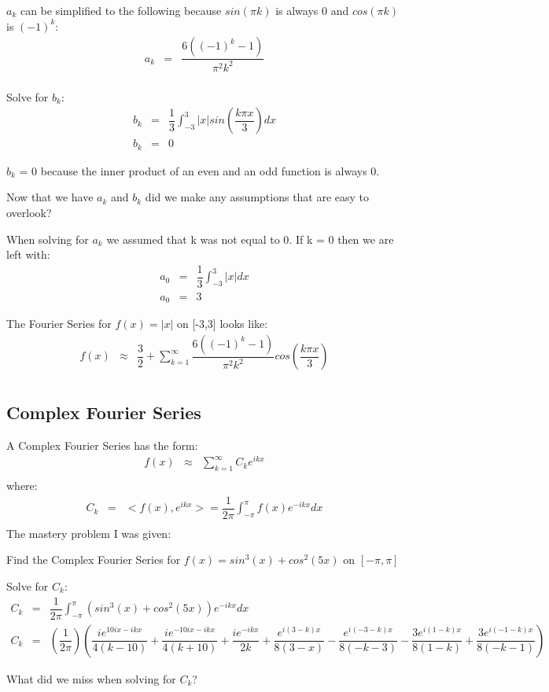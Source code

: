 \documentclass{article}
\newcommand{\bea}{\begin{eqnarray*}}
\newcommand{\eea}{\end{eqnarray*}}
\newcommand{\blue}[1]{\textcolor{blue}{#1}}
\begin{document}
$a_k$ can be simplified to the following because $sin(\pi k)$ is always 0 and $cos(\pi k)$ is $(-1)^k$:
\bea
a_k &=& \dfrac{6((-1)^k-1)}{\pi^2 k^2}\\
\eea

Solve for $b_k$:
\bea
b_k &=& \dfrac{1}{3}\int_{-3}^{3} |x|sin(\dfrac{k \pi x}{3})dx\\
b_k &=& 0
\eea

$b_k$ = 0 because the inner product of an even and an odd function is always 0.\newline 

Now that we have $a_k$ and $b_k$ did we make any assumptions that are easy to overlook?\newline

When solving for $a_k$ we assumed that k was not equal to 0. If k = 0 then we are left with:
\bea
a_0 &=& \dfrac{1}{3}\int_{-3}^{3} |x|dx\\
a_0 &=& 3
\eea

The Fourier Series for $f(x) = |x|$ on [-3,3] looks like:
\bea
f(x) &\approx& \dfrac{3}{2}+\sum_{k=1}^{\infty} \dfrac{6((-1)^k-1)}{\pi^2 k^2}cos(\dfrac{k \pi x}{3}) \\
\eea

\subsection{Complex Fourier Series}
A Complex Fourier Series has the form:
\bea
f(x) &\approx& \sum_{k=1}^{\infty} C_ke^{ikx} \\
\eea
where:
\bea
C_k &=& <f(x),e^{ikx}> = \dfrac{1}{2\pi}\int_{-\pi}^{\pi} f(x)e^{-ikx}dx \\
\eea
The mastery problem I was given: \newline

Find the Complex Fourier Series for $f(x) = sin^3(x)+cos^2(5x)$ on $[-\pi,\pi]$

Solve for $C_k$:
\bea
C_k &=& \dfrac{1}{2\pi}\int_{-\pi}^{\pi} (sin^3(x)+cos^2(5x))e^{-ikx}dx\\
C_k &=& (\dfrac{1}{2\pi})(\dfrac{ie^{10ix-ikx}}{4(k-10)} + \dfrac{ie^{-10ix-ikx}}{4(k+10)} + \dfrac{ie^{-ikx}}{2k} + \dfrac{e^{i(3-k)x}}{8(3-x)} - \dfrac{e^{i(-3-k)x}}{8(-k-3)} - \dfrac{3e^{i(1-k)x}}{8(1-k)} + \dfrac{3e^{i(-1-k)x}}{8(-k-1)})
\eea

What did we miss when solving for $C_k$?\newline
\end{document}
